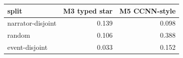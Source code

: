 \setlength{\tabcolsep}{3pt}
\begin{tabular}{lrr}
\toprule
split & M3 typed star & M5 CCNN-style \\
\midrule
narrator-disjoint & 0.139 & 0.098 \\
random & 0.106 & 0.388 \\
event-disjoint & 0.033 & 0.152 \\
\bottomrule
\end{tabular}